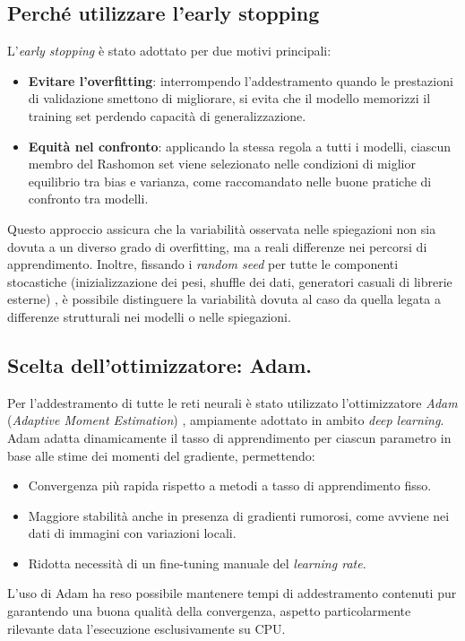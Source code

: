 \documentclass[12pt,a4paper,oneside]{report}
\numberwithin{figure}{chapter}
\numberwithin{table}{chapter}
\begin{document}
\subsection{Perché utilizzare l’early stopping}
L’\emph{early stopping} \citep{prechelt1998early} è stato adottato per due
motivi principali:
\begin{itemize}
      \item \textbf{Evitare l’overfitting}: interrompendo l’addestramento quando le prestazioni di validazione smettono di migliorare, si evita che il modello memorizzi il training set perdendo capacità di generalizzazione.
      \item \textbf{Equità nel confronto}: applicando la stessa regola a tutti i modelli, ciascun membro del Rashomon set viene selezionato nelle condizioni di miglior equilibrio tra bias e varianza, come raccomandato nelle buone pratiche di confronto tra modelli.
\end{itemize}

Questo approccio assicura che la variabilità osservata nelle spiegazioni non
sia dovuta a un diverso grado di overfitting, ma a reali differenze nei
percorsi di apprendimento. Inoltre, fissando i \emph{random seed} per tutte le
componenti stocastiche (inizializzazione dei pesi, shuffle dei dati, generatori
casuali di librerie esterne) \citep{reimers2017reporting}, è possibile
distinguere la variabilità dovuta al caso da quella legata a differenze
strutturali nei modelli o nelle spiegazioni.

\subsection{Scelta dell’ottimizzatore: Adam.}
Per l’addestramento di tutte le reti neurali è stato utilizzato l’ottimizzatore
\emph{Adam} (\emph{Adaptive Moment Estimation}) \citep{kingma2014adam},
ampiamente adottato in ambito \emph{deep learning}. Adam adatta dinamicamente
il tasso di apprendimento per ciascun parametro in base alle stime dei momenti
del gradiente, permettendo:
\begin{itemize}
      \item Convergenza più rapida rispetto a metodi a tasso di apprendimento fisso.
      \item Maggiore stabilità anche in presenza di gradienti rumorosi, come avviene nei
            dati di immagini con variazioni locali.
      \item Ridotta necessità di un fine-tuning manuale del \emph{learning rate}.
\end{itemize}
L’uso di Adam ha reso possibile mantenere tempi di addestramento contenuti pur garantendo
una buona qualità della convergenza, aspetto particolarmente rilevante data
l’esecuzione esclusivamente su CPU.
\end{document}
